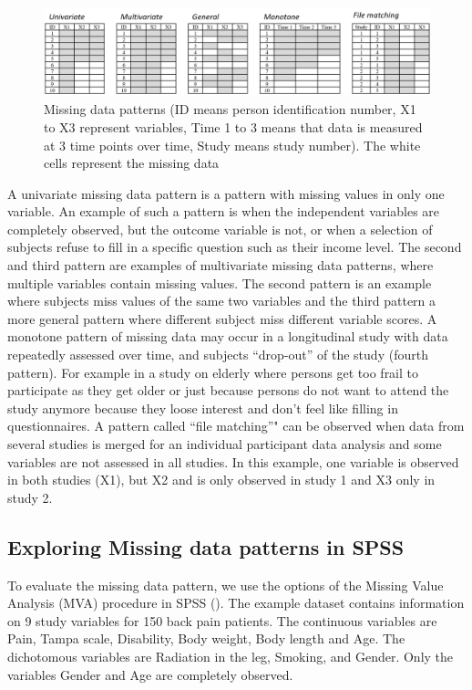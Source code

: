 \documentclass[]{book}
\begin{document}
\begin{figure}

{\centering \includegraphics[width=0.9\linewidth]{images/fig2.2} 

}

\caption{Missing data patterns (ID means person identification number, X1 to X3 represent variables, Time 1 to 3 means that data is measured at 3 time points over time, Study means study number). The white cells represent the missing data}\label{fig:fig2-2}
\end{figure}

A univariate missing data pattern is a pattern with missing values in
only one variable. An example of such a pattern is when the independent
variables are completely observed, but the outcome variable is not, or
when a selection of subjects refuse to fill in a specific question such
as their income level. The second and third pattern are examples of
multivariate missing data patterns, where multiple variables contain
missing values. The second pattern is an example where subjects miss
values of the same two variables and the third pattern a more general
pattern where different subject miss different variable scores. A
monotone pattern of missing data may occur in a longitudinal study with
data repeatedly assessed over time, and subjects ``drop-out'' of the
study (fourth pattern). For example in a study on elderly where persons
get too frail to participate as they get older or just because persons
do not want to attend the study anymore because they loose interest and
don't feel like filling in questionnaires. A pattern called ``file
matching''" can be observed when data from several studies is merged for
an individual participant data analysis and some variables are not
assessed in all studies. In this example, one variable is observed in
both studies (X1), but X2 and is only observed in study 1 and X3 only in
study 2.

\subsection{Exploring Missing data patterns in
SPSS}\label{exploring-missing-data-patterns-in-spss}

To evaluate the missing data pattern, we use the options of the Missing
Value Analysis (MVA) procedure in SPSS (\citet{spss75}). The example
dataset contains information on 9 study variables for 150 back pain
patients. The continuous variables are Pain, Tampa scale, Disability,
Body weight, Body length and Age. The dichotomous variables are
Radiation in the leg, Smoking, and Gender. Only the variables Gender and
Age are completely observed.
\end{document}
